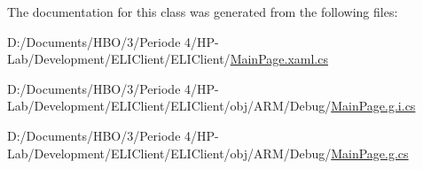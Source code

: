 The documentation for this class was generated from the following files\+:\begin{DoxyCompactItemize}
\item 
D\+:/\+Documents/\+H\+B\+O/3/\+Periode 4/\+H\+P-\/\+Lab/\+Development/\+E\+L\+I\+Client/\+E\+L\+I\+Client/\hyperlink{_e_l_i_client_2_e_l_i_client_2_main_page_8xaml_8cs}{Main\+Page.\+xaml.\+cs}\item 
D\+:/\+Documents/\+H\+B\+O/3/\+Periode 4/\+H\+P-\/\+Lab/\+Development/\+E\+L\+I\+Client/\+E\+L\+I\+Client/obj/\+A\+R\+M/\+Debug/\hyperlink{_e_l_i_client_2_e_l_i_client_2obj_2_a_r_m_2_debug_2_main_page_8g_8i_8cs}{Main\+Page.\+g.\+i.\+cs}\item 
D\+:/\+Documents/\+H\+B\+O/3/\+Periode 4/\+H\+P-\/\+Lab/\+Development/\+E\+L\+I\+Client/\+E\+L\+I\+Client/obj/\+A\+R\+M/\+Debug/\hyperlink{_e_l_i_client_2_e_l_i_client_2obj_2_a_r_m_2_debug_2_main_page_8g_8cs}{Main\+Page.\+g.\+cs}\end{DoxyCompactItemize}
